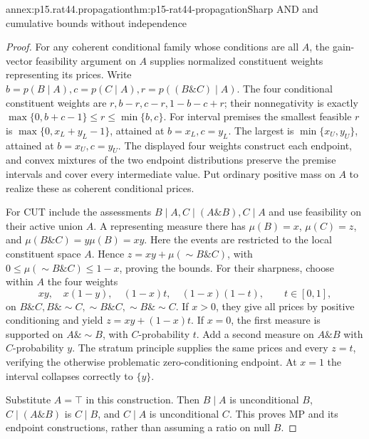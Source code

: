 \begin{annexitem}{annex:p15.rat44.propagation}{thm:p15-rat44-propagation}{Sharp AND and cumulative bounds without independence}
\begin{proof}
For any coherent conditional family whose conditions are all \(A\),
the gain-vector feasibility argument on \(A\) supplies normalized
constituent weights representing its prices. Write
\(b=p(B\mid A),c=p(C\mid A),r=p((B\mathbin{\&}C)\mid A)\).
The four conditional constituent weights are
\(r,b-r,c-r,1-b-c+r\); their nonnegativity is exactly
\(\max\{0,b+c-1\}\leq r\leq\min\{b,c\}\).
For interval premises the smallest feasible \(r\) is
\(\max\{0,x_L+y_L-1\}\), attained at \(b=x_L,c=y_L\).
The largest is \(\min\{x_U,y_U\}\), attained at
\(b=x_U,c=y_U\). The displayed four weights construct each
endpoint, and convex mixtures of the two endpoint distributions
preserve the premise intervals and cover every intermediate value.
Put ordinary positive mass on \(A\) to realize these as coherent
conditional prices.

For CUT include the assessments
\(B\mid A,C\mid(A\mathbin{\&}B),C\mid A\)
and use feasibility on their active union \(A\). A representing
measure there has \(\mu(B)=x\), \(\mu(C)=z\), and
\(\mu(B\mathbin{\&}C)=y\mu(B)=xy\). Here the events are restricted
to the local constituent space \(A\). Hence
\(z=xy+\mu(\sim B\mathbin{\&}C)\), with
\(0\leq\mu(\sim B\mathbin{\&}C)\leq1-x\), proving the bounds.
For their sharpness, choose within \(A\) the four weights
\[
             xy,\quad x(1-y),\quad(1-x)t,\quad(1-x)(1-t),
             \qquad t\in[0,1],
\]
on \(B\mathbin{\&}C,B\mathbin{\&}\sim C,
      \sim B\mathbin{\&}C,\sim B\mathbin{\&}\sim C\).
If \(x>0\), they
give all prices by positive conditioning and yield
\(z=xy+(1-x)t\). If \(x=0\), the first measure is supported on
\(A\mathbin{\&}\sim B\), with \(C\)-probability \(t\). Add a second
measure on \(A\mathbin{\&}B\) with \(C\)-probability \(y\). The stratum
principle supplies the same prices and every \(z=t\), verifying
the otherwise problematic zero-conditioning endpoint. At \(x=1\)
the interval collapses correctly to \(\{y\}\).

Substitute \(A=\top\) in this construction. Then \(B\mid A\)
is unconditional \(B\), \(C\mid(A\mathbin{\&}B)\) is \(C\mid B\), and
\(C\mid A\) is unconditional \(C\). This proves MP and its
endpoint constructions, rather than assuming a ratio on null \(B\).
\end{proof}
\end{annexitem}

